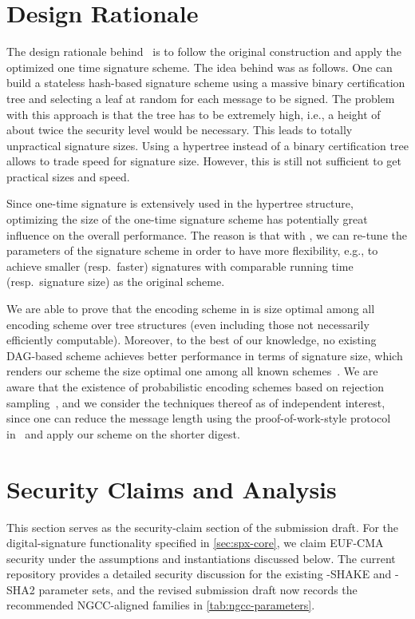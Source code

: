\section{Design Rationale}
\label{sec:design-rationale}

The design rationale behind \SPHINCSA\ is to follow the original \SPHINCSP construction and apply the optimized \WOTSCS one time signature scheme. The idea behind \SPHINCSP was as follows. One can build a stateless hash-based signature scheme using a massive binary certification tree and selecting a leaf at random for each message to be signed. The problem with this approach is that the tree has to be extremely high, i.e., a height of about twice the security level would be necessary. This leads to totally unpractical signature sizes. Using a hypertree instead of a binary certification tree allows to trade speed for signature size. However, this is still not sufficient to get practical sizes and speed.

Since one-time signature is extensively used in the \SPHINCSP hypertree structure, optimizing the size of the one-time signature scheme has potentially great influence on the overall performance. The reason is that with \WOTSCS, we can re-tune the parameters of the signature scheme in order to have more flexibility, e.g., to achieve smaller (resp.~faster) signatures with comparable running time (resp.~signature size) as the original \SPHINCSP scheme.

We are able to prove that the encoding scheme in \WOTSCS is size optimal among all encoding scheme over tree structures (even including those not necessarily efficiently computable). Moreover, to the best of our knowledge, no existing DAG-based scheme achieves better performance in terms of signature size, which renders our scheme the size optimal one among all known schemes~\cite{optimalwots}. We are aware that the existence of probabilistic encoding schemes based on rejection sampling~\cite{cryptoeprint:2022/778}, and we consider the techniques thereof as of independent interest, since one can reduce the message length using the proof-of-work-style protocol in~\cite{cryptoeprint:2022/778} and apply our scheme on the shorter digest.


\section{Security Claims and Analysis}
\label{sec:security-claims}

This section serves as the security-claim section of the submission draft. For the digital-signature functionality specified in \cref{sec:spx-core}, we claim EUF-CMA security under the assumptions and instantiations discussed below. The current repository provides a detailed security discussion for the existing \SPHINCSA-SHAKE and \SPHINCSA-SHA2 parameter sets, and the revised submission draft now records the recommended NGCC-aligned families in \cref{tab:ngcc-parameters}.

